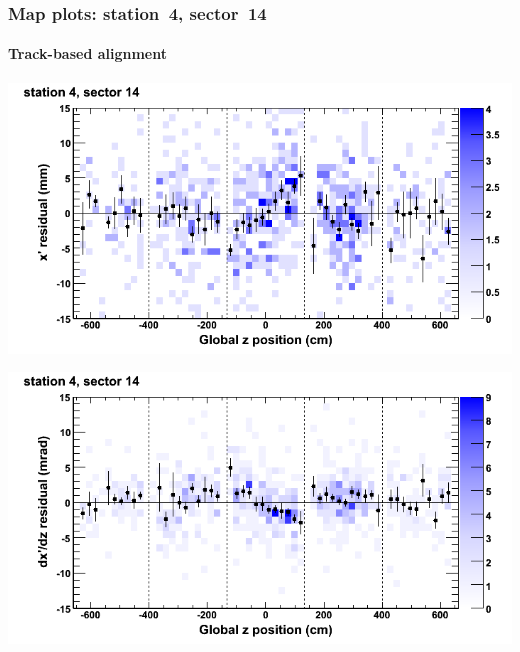 \documentclass[compress]{beamer}
\begin{document}
\begin{frame}
\frametitle{Map plots: station~4, sector~14}
\framesubtitle{Track-based alignment}
\includegraphics[width=0.5\linewidth]{mapplots_re05/DTvsz_st4sec14_x.png}

\includegraphics[width=0.5\linewidth]{mapplots_re05/DTvsz_st4sec14_dxdz.png}
\end{frame}


\end{document}
